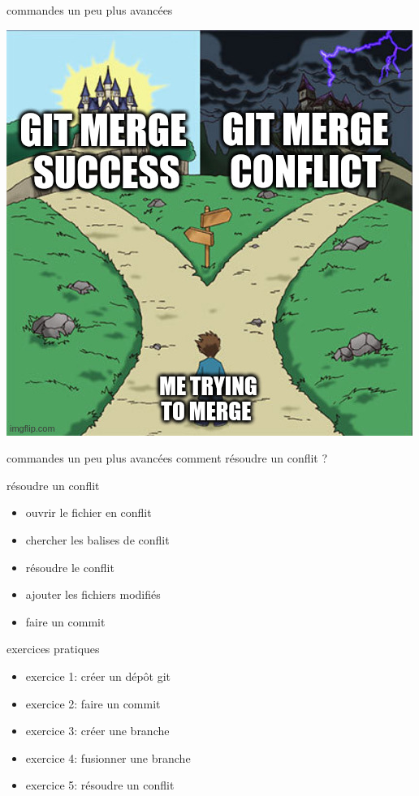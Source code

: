 \documentclass[usenames,dvipsnames]{beamer}
\begin{document}
\begin{frame}[fragile]{commandes un peu plus avancées}
	\begin{center}
		\includegraphics[width=0.7\linewidth]{Im/merge_outcome.jpg}
	\end{center}
\end{frame}

\begin{frame}[fragile]{commandes un peu plus avancées}
	comment résoudre un conflit ?
	\begin{blueblock}{résoudre un conflit}
		\begin{itemize}
			\item ouvrir le fichier en conflit
			\item chercher les balises de conflit
			\item résoudre le conflit
			\item ajouter les fichiers modifiés
			\item faire un commit
		\end{itemize}
	\end{blueblock}
\end{frame}


\begin{frame}[fragile]{exercices pratiques}
	\begin{itemize}
		\item exercice 1: créer un dépôt git
		\item exercice 2: faire un commit
		\item exercice 3: créer une branche
		\item exercice 4: fusionner une branche
		\item exercice 5: résoudre un conflit 
	\end{itemize}
\end{frame}
\end{document}
